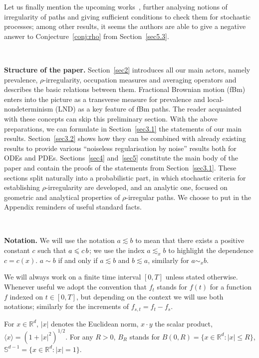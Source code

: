 \documentclass[10pt]{article}
\newcommand{\tmstrong}[1]{\textbf{#1}}
\newcommand{\tmtextbf}[1]{{\bfseries{#1}}}
\begin{document}
Let us finally mention the upcoming works~{\cite{tolomeo1,tolomeo2}}, further
analysing notions of irregularity of paths and giving sufficient conditions to
check them for stochastic processes; among other results, it seems the authors
are able to give a negative answer to Conjecture~\ref{conj:rho} from
Section~\ref{sec5.3}.

\

\tmtextbf{Structure of the paper.} Section~\ref{sec2} introduces all our main
actors, namely prevalence, $\rho$-irregularity, occupation measures and
averaging operators and describes the basic relations between them. Fractional
Brownian motion (fBm) enters into the picture as a transverse measure for
prevalence and local-nondeterminism (LND) as a key feature of fBm paths. The
reader acquainted with these concepts can skip this preliminary section. With
the above preparations, we can formulate in Section~\ref{sec3.1} the
statements of our main results. Section~\ref{sec3.2} shows how they can be
combined with already existing results to provide various ``noiseless
regularisation by noise'' results both for ODEs and PDEs. Sections~\ref{sec4}
and~\ref{sec5} constitute the main body of the paper and contain the proofs of
the statements from Section~\ref{sec3.1}. These sections split naturally into
a probabilistic part, in which stochastic criteria for establishing
$\rho$-irregularity are developed, and an analytic one, focused on geometric
and analytical properties of $\rho$-irregular paths. We choose to put in the
Appendix reminders of useful standard facts.

\

{\tmstrong{Notation.}} We will use the notation $a \lesssim b$ to mean that
there exists a positive constant $c$ such that $a \leqslant c \hspace{0.17em}
b$; we use the index $a \lesssim_x b$ to highlight the dependence $c = c (x)$.
$a \sim b$ if and only if $a \lesssim b$ and $b \lesssim a$, similarly for $a
\sim_x b$.

We will always work on a finite time interval $[0, T]$ unless stated
otherwise. Whenever useful we adopt the convention that $f_t$ stands for $f
(t)$ for a function $f$ indexed on $t \in [0, T]$, but depending on the
context we will use both notations; similarly for the increments of $f_{s, t}
= f_t - f_s$.

For $x \in \mathbb{R}^d$, $|x|$ denotes the Euclidean norm, $x \cdot y$ the
scalar product, $\langle x \rangle = (1 + |x|^2)^{1 / 2}$. For any $R > 0$,
$B_R$ stands for $B (0, R) = \{x \in \mathbb{R}^d : |x| \leqslant R\}$,
$\mathbb{S}^{d - 1} = \{x \in \mathbb{R}^d : |x| = 1\}$.
\end{document}
